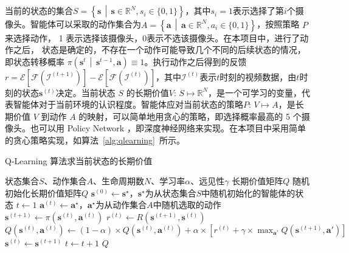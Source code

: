 当前的状态的集合$S=\left\{\boldsymbol{s}\,\middle\vert\,\boldsymbol{s}\in\mathbb{R}^{N}, s_i\in\{0, 1\}\right\}$，其中$s_i=1$表示选择了第$i$个摄像头。智能体可以采取的动作集合为$A=\left\{\boldsymbol{a}\,\middle\vert\,\boldsymbol{a}\in\mathbb{R}^N,a_i \in \{0,1\}\right\}$，按照策略 $P$ 来选择动作， 1 表示选择该摄像头，0表示不选该摄像头。在本项目中，进行了动作之后， 状态是确定的，不存在一个动作可能导致几个不同的后续状态的情况，即状态转移概率 $\pi\left(\boldsymbol{s}^t\,\middle\vert\,\boldsymbol{s}^{t-1}, \boldsymbol{a}\right)\equiv1$。执行动作之后得到的反馈$r=\mathcal{E}\left[\mathcal{F}\left(\mathcal{I}^{(t+1)}\right)\right]-\mathcal{E}\left[\mathcal{F}\left(\mathcal{I}^{(t)}\right)\right]$，其中$\mathcal{I}^{(t)}$表示$t$时刻的视频数据，由$t$时刻的状态$\boldsymbol{s}^{(t)}$决定。当前状态 $S$ 的长期价值$V:\,S\mapsto\mathbb{R}^N$，是一个可学习的变量，代表智能体对于当前环境的认识程度。智能体应对当前状态的策略$P:\,V\mapsto A$，是长期价值 $V$ 到动作 $A$ 的映射，可以简单地用贪心的策略，即选择概率最高的 5 个摄像头。也可以用 Policy Network ，即深度神经网络来实现。在本项目中采用简单的贪心策略实现，如算法~\ref{alg:qlearning}~所示。

\begin{algorithm}[!htb]
    \caption{Q-Learning 算法求当前状态的长期价值}
    \label{alg:qlearning}
    \begin{algorithmic}[1]
        \Require 状态集合$S$、动作集合$A$、生命周期数$N$、学习率$\alpha$、远见性$\gamma$
        \Ensure 长期价值矩阵$Q$
            \State 随机初始化长期价值矩阵$Q$
                \State $\boldsymbol{s}^{(0)}\gets\boldsymbol{s}^\star$，$\boldsymbol{s}^\star$为从状态集合$S$中随机初始化的智能体的状态
                \State $t\gets1$
                \Repeat
                    \State $\boldsymbol{a}^{(t)}\gets \boldsymbol{a}^\star$，$\boldsymbol{a}^\star$为从动作集合$A$中随机选取的动作
                    \State $\boldsymbol{s}^{(t+1)}\gets \pi\left(\boldsymbol{s}^{(t)}, \boldsymbol{a}^{(t)}\right)$
                    \State $r^{(t)}\gets R\left(\boldsymbol{s}^{(t+1)},\boldsymbol{s}^{(t)}\right)$
                    \State $Q\left(\boldsymbol{s}^{(t)},\boldsymbol{a}^{(t)}\right)\gets(1-\alpha)\times Q\left(\boldsymbol{s}^{(t)},\boldsymbol{a}^{(t)}\right)+\alpha\times\left[r^{(t)}+\gamma\times\max_{\boldsymbol{a}'}Q\left(\boldsymbol{s}^{(t+1)}, \boldsymbol{a}'\right)\right]$
                    \State $\boldsymbol{s}^{(t)}\gets\boldsymbol{s}^{(t+1)}$
                    \State $t\gets  t+1$
            \EndFor
            \State\Return $Q$
        \EndFunction
    \end{algorithmic}
\end{algorithm}

